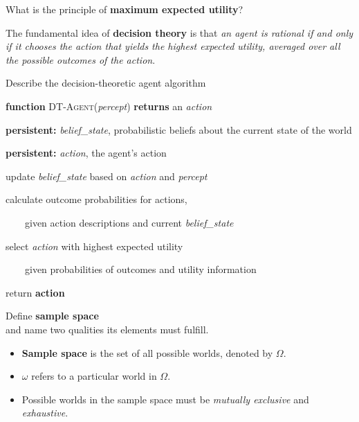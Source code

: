 \begin{flashcard}[Question]{What is the principle of \textbf{maximum expected utility}?}

The fundamental idea of \textbf{decision theory} is that \textit{an agent is rational if and only if it chooses the action that yields the highest expected utility, averaged over all the possible outcomes of the action}.

\end{flashcard}

\begin{flashcard}[Question]{Describe the decision-theoretic agent algorithm}

\textbf{function} \textsc{DT-Agent}(\textit{percept}) \textbf{returns} an \textit{action}

\medskip

\textbf{persistent:} \textit{belief\_state}, probabilistic beliefs about the current state of the world

\textbf{persistent:} \textit{action}, the agent's action

\medskip

update \textit{belief\_state} based on \textit{action} and \textit{percept}

calculate outcome probabilities for actions,

~~~~given action descriptions and current \textit{belief\_state}

select \textit{action} with highest expected utility

~~~~given probabilities of outcomes and utility information

return \textbf{action}

\end{flashcard}

\begin{flashcard}[Question]{Define \textbf{sample space}\\and name two qualities its elements must fulfill.}

\begin{itemize}
\item \textbf{Sample space} is the set of all possible worlds, denoted by $\Omega$.
\item $\omega$ refers to a particular world in $\Omega$.
\item Possible worlds in the sample space must be \textit{mutually exclusive} and \textit{exhaustive}.
\end{itemize}

\end{flashcard}

